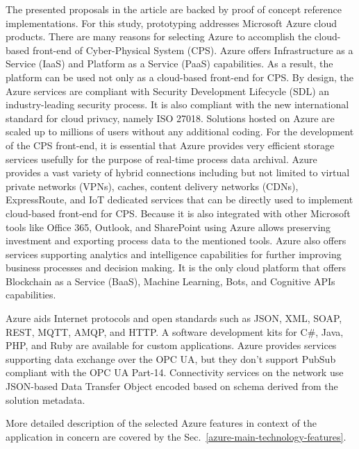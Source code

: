 \documentclass{jacsart}
\begin{document}
The presented proposals in the article are backed by proof of concept reference implementations. For this study, prototyping addresses Microsoft Azure cloud products. There are many reasons for selecting Azure to accomplish the cloud-based front-end of Cyber-Physical System (CPS). Azure offers Infrastructure as a Service (IaaS) and Platform as a Service (PaaS) capabilities. As a result, the platform can be used not only as a cloud-based front-end for CPS. By design, the Azure services are compliant with Security Development Lifecycle (SDL) an industry-leading security process. It is also compliant with the new international standard for cloud privacy, namely ISO 27018. Solutions hosted on Azure are scaled up to millions of users without any additional coding. For the development of the CPS front-end, it is essential that Azure provides very efficient storage services usefully for the purpose of real-time process data archival. Azure provides a vast variety of hybrid connections including but not limited to virtual private networks (VPNs), caches, content delivery networks (CDNs), ExpressRoute, and IoT dedicated services that can be directly used to implement cloud-based front-end for CPS. Because it is also integrated with other Microsoft tools like Office 365, Outlook, and SharePoint using Azure allows preserving investment and exporting process data to the mentioned tools. Azure also offers services supporting analytics and intelligence capabilities for further improving business processes and decision making. It is the only cloud platform that offers Blockchain as a Service (BaaS), Machine Learning, Bots, and Cognitive APIs capabilities.

Azure aids Internet protocols and open standards such as JSON, XML, SOAP, REST, MQTT, AMQP, and HTTP. A software development kits for C\#, Java, PHP, and Ruby are available for custom applications. Azure provides services supporting data exchange over the OPC UA, but they don't support PubSub compliant with the OPC UA Part-14\cite{RefWorks:doc:5d98837de4b055984c0eecf0}. Connectivity services on the network use JSON-based Data Transfer Object encoded based on schema derived from the solution metadata.

More detailed description of the selected Azure features in context of the application in concern are covered by the Sec.~\ref*{azure-main-technology-features}.
\end{document}
